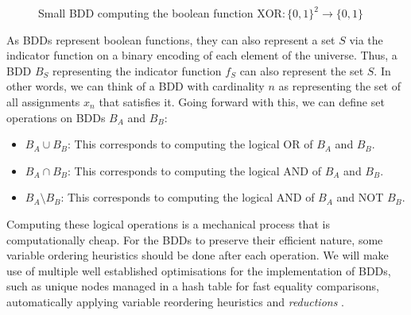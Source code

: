 \documentclass[../master/master.tex]{subfiles}
\begin{document}
\begin{figure}[H]
\center
{}
\caption{Small BDD computing the boolean function $\text{XOR}:\{0,1\}^2 \rightarrow \{0,1\}$}
\label{simplebdd}
\end{figure}

As BDDs represent boolean functions, they can also represent a set $S$ via the indicator function on a binary encoding of each element of the universe. Thus, a BDD $B_S$ representing the indicator function $f_S$ can also represent the set $S$. In other words, we can think of a BDD with cardinality $n$ as representing the set of all assignments $x_n$ that satisfies it. Going forward with this, we can define set operations on BDDs $B_A$ and $B_B$:
\begin{itemize}
\item $B_A\cup B_B$: This corresponds to computing the logical OR of $B_A$ and $B_B$.
\item $B_A\cap B_B$: This corresponds to computing the logical AND of $B_A$ and $B_B$.
\item $B_A\setminus B_B$: This corresponds to computing the logical AND of $B_A$ and NOT $B_B$.
\end{itemize}

Computing these logical operations is a mechanical process that is computationally cheap. For the BDDs to preserve their efficient nature, some variable ordering heuristics should be done after each operation. We will make use of multiple well established optimisations for the implementation of BDDs, such as unique nodes managed in a hash table \cite{hashing1, hashing2} for fast equality comparisons, automatically applying variable reordering heuristics \cite{reordering} and \textit{reductions} \cite{bryant_1992}. 
\end{document}
